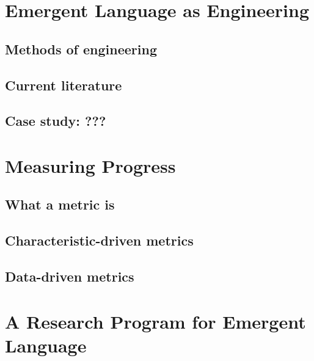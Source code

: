 \documentclass[letterpaper]{report}
\begin{document}
\chapter{Emergent Language as Engineering}
\section{Methods of engineering}
\section{Current literature}
\section{Case study: ???}

\chapter{Measuring Progress}
\section{What a metric is}
\section{Characteristic-driven metrics}
\section{Data-driven metrics}

\chapter{A Research Program for Emergent Language}




\end{document}
